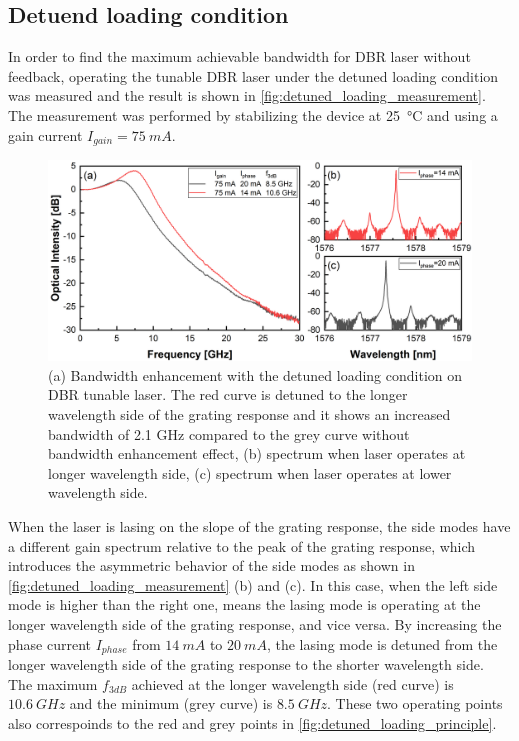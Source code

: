 \subsection{Detuend loading condition}\label{subsec:detuned_laoding_measurement}
In order to find the maximum achievable bandwidth for DBR laser without feedback, operating the tunable DBR laser under the detuned loading condition was measured and the result is shown in \autoref{fig:detuned_loading_measurement}. The measurement was performed by stabilizing the device at \SI{25}{\celsius} and using a gain current $I_{gain}=75 \ mA$. 


\begin{figure}[ht]
    \centering
    \includegraphics[width=\linewidth]{figures/detuned_loading.png}
    \caption{(a) Bandwidth enhancement with the detuned loading condition on DBR tunable laser. The red curve is detuned to the longer wavelength side of the grating response and it shows an increased bandwidth of 2.1 GHz compared to the grey curve without bandwidth enhancement effect, (b) spectrum when laser operates at longer wavelength side, (c) spectrum when laser operates at lower wavelength side.}
    \label{fig:detuned_loading_measurement}
\end{figure}

When the laser is lasing on the slope of the grating response, the side modes have a different gain spectrum relative to the peak of the grating response, which introduces the asymmetric behavior of the side modes as shown in \autoref{fig:detuned_loading_measurement} (b) and (c). In this case, when the left side mode is higher than the right one, means the lasing mode is operating at the longer wavelength side of the grating response, and vice versa. By increasing the phase current $I_{phase}$ from $14 \ mA$ to $20 \ mA$, the lasing mode is detuned from the longer wavelength side of the grating response to the shorter wavelength side. The maximum $f_{3dB}$ achieved at the longer wavelength side (red curve) is $10.6 \ GHz$ and the minimum (grey curve) is $8.5 \ GHz$. These two operating points also correspoinds to the red and grey points in \autoref{fig:detuned_loading_principle}.

